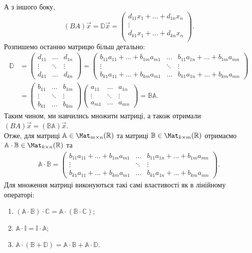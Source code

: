 \documentclass{math_library}
\begin{document}
	А з іншого боку, 
	\[
	(BA)\vec{x} = \mathbb{D}\vec{x} =
	\begin{pmatrix}
	d_{11} x_1 + \dots + d_{1n} x_n \\
	\vdots \\
	d_{k1} x_1 + \dots + d_{kn} x_n \\
	\end{pmatrix}.
	\]
	Розпишемо останню матрицю більш детально:
	\begin{align*}
	\mathbb{D} & = \begin{pmatrix}
	d_{11} & \dots & d_{1n}\\
	\vdots & \ddots & \vdots \\
	d_{k1} & \dots & d_{kn}
	\end{pmatrix} =
	\begin{pmatrix}
	b_{11}a_{11}+\dots+b_{1m}a_{m1} & \dots & b_{11}a_{1n}+\dots+b_{1m}a_{mn} \\
	\vdots & \ddots & \vdots \\
	b_{k1}a_{11} + \dots + b_{km}a_{m1} & \dots & b_{k1}a_{1n} + \dots + b_{km}a_{mn} 
	\end{pmatrix} \\
	 & =
	\begin{pmatrix}
	b_{11} & \dots & b_{1m}\\
	\vdots & \ddots & \vdots \\
	b_{k1} & \dots & b_{km}
	\end{pmatrix}
	\begin{pmatrix}
	a_{11} & \dots & a_{1n}\\
	\vdots & \ddots & \vdots \\
	a_{m1} & \dots & a_{mn}
	\end{pmatrix} = \mathbb{B} \mathbb{A}.
	\end{align*}
	Таким чином, ми навчились множити матриці, а також отримали $(BA)\vec{x} = (\mathbb{B} \mathbb{A})\vec{x}$.
	\bigskip \\
	Отже, для матриці $\mathbb{A} \in \Mat_{m \times n}(\mathbb{R})$ та матриці $\mathbb{B} \in \Mat_{k \times m}(\mathbb{R})$ отримаємо $\mathbb{A} \cdot \mathbb{B} \in \Mat_{k \times n}(\mathbb{R})$ та
	\begin{align*}
\mathbb{A} \cdot \mathbb{B} = \begin{pmatrix}
	b_{11}a_{11}+\dots+b_{1m}a_{m1} & \dots & b_{11}a_{1n}+\dots+b_{1m}a_{mn} \\
	\vdots & \ddots & \vdots \\
	b_{k1}a_{11} + \dots + b_{km}a_{m1} & \dots & b_{k1}a_{1n} + \dots + b_{km}a_{mn} 
	\end{pmatrix}.
	\end{align*}
	Для множення матриці виконуються такі самі властивості як в лінійному операторі:
	\begin{enumerate}[nosep, label={\arabic*)}, wide=0pt]
	\item $(\mathbb{A} \cdot \mathbb{B}) \cdot \mathbb{C} = \mathbb{A} \cdot (\mathbb{B} \cdot \mathbb{C})$;
	\item $\mathbb{A} \cdot \mathbb{I} = \mathbb{I} \cdot \mathbb{A}$;
	\item $\mathbb{A} \cdot (\mathbb{B} + \mathbb{D}) = \mathbb{A} \cdot \mathbb{B} + \mathbb{A} \cdot \mathbb{D}$.
	\end{enumerate}
	
\end{document}
